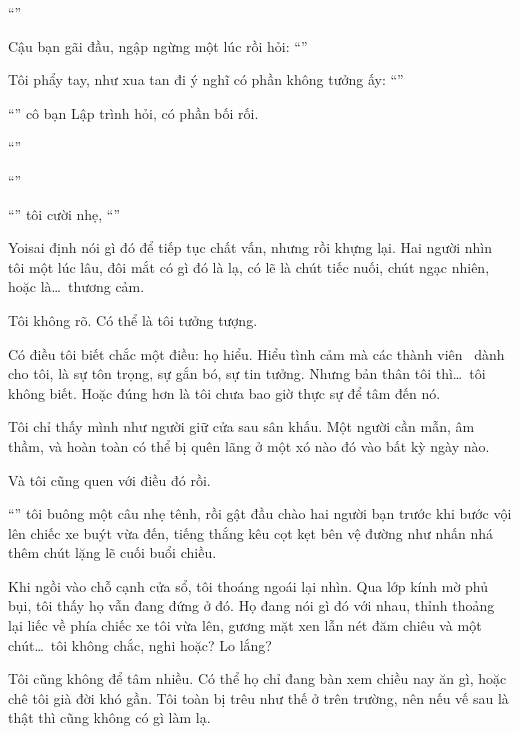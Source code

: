 \documentclass[../main.tex]{subfiles}
\begin{document}
``''

Cậu bạn gãi đầu, ngập ngừng một lúc rồi hỏi: ``''

Tôi phẩy tay, như xua tan đi ý nghĩ có phần không tưởng ấy: ``''

``'' cô bạn Lập trình hỏi, có phần bối rối.

``''

``''

``'' tôi cười nhẹ, ``''

Yoisai định nói gì đó để tiếp tục chất vấn, nhưng rồi khựng lại. Hai người nhìn tôi một lúc lâu, đôi mắt có gì đó là lạ, có lẽ là chút tiếc nuối, chút ngạc nhiên, hoặc là\dots\ thương cảm.

Tôi không rõ. Có thể là tôi tưởng tượng.

Có điều tôi biết chắc một điều: họ hiểu. Hiểu tình cảm mà các thành viên \hll\ dành cho tôi, là sự tôn trọng, sự gắn bó, sự tin tưởng. Nhưng bản thân tôi thì\dots\ tôi không biết. Hoặc đúng hơn là tôi chưa bao giờ thực sự để tâm đến nó.

Tôi chỉ thấy mình như người giữ cửa sau sân khấu. Một người cần mẫn, âm thầm, và hoàn toàn có thể bị quên lãng ở một xó nào đó vào bất kỳ ngày nào.

Và tôi cũng quen với điều đó rồi.

``'' tôi buông một câu nhẹ tênh, rồi gật đầu chào hai người bạn trước khi bước vội lên chiếc xe buýt vừa đến, tiếng thắng kêu cọt kẹt bên vệ đường như nhấn nhá thêm chút lặng lẽ cuối buổi chiều.

Khi ngồi vào chỗ cạnh cửa sổ, tôi thoáng ngoái lại nhìn. Qua lớp kính mờ phủ bụi, tôi thấy họ vẫn đang đứng ở đó. Họ đang nói gì đó với nhau, thỉnh thoảng lại liếc về phía chiếc xe tôi vừa lên, gương mặt xen lẫn nét đăm chiêu và một chút\dots\ tôi không chắc, nghi hoặc? Lo lắng?

Tôi cũng không để tâm nhiều. Có thể họ chỉ đang bàn xem chiều nay ăn gì, hoặc chê tôi già đời khó gần. Tôi toàn bị trêu như thế ở trên trường, nên nếu vế sau là thật thì cũng không có gì làm lạ.
\end{document}
